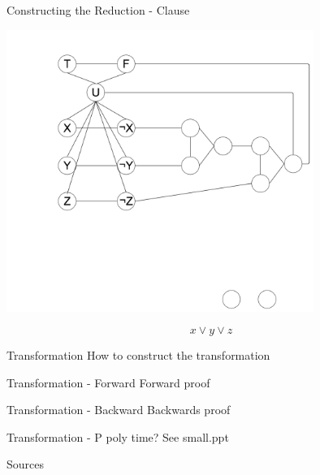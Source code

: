 \documentclass[bigger]{beamer}
\begin{document}
\begin{frame}[label=sec-13]{Constructing the Reduction - Clause}
\begin{center}
\includegraphics[width=10cm]{Comb2.png}
\end{center}

\[x\vee y \vee z\] 
\end{frame}

\begin{frame}[label=sec-14]{Transformation}
How to construct the transformation
\end{frame}

\begin{frame}[label=sec-15]{Transformation - Forward}
Forward proof
\end{frame}

\begin{frame}[label=sec-16]{Transformation - Backward}
Backwards proof
\end{frame}

\begin{frame}[label=sec-17]{Transformation - P}
poly time? See small.ppt
\end{frame}

\begin{frame}[label=sec-18]{Sources}
\end{frame}
\end{document}
